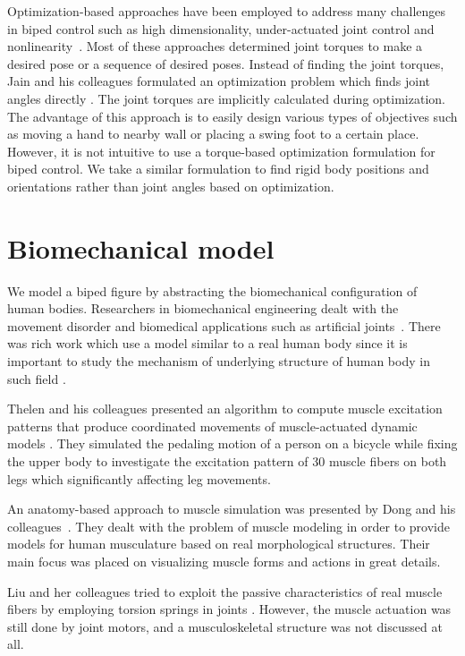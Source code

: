 \documentclass[master,english,final]{kaist-ucs}
\begin{document}
Optimization-based approaches have been employed to address many challenges
in biped control such as high dimensionality, under-actuated joint control and
nonlinearity~\cite{journals/tog/MacchiettoZS09, journals/tog/MuicoLPP09, park}.
Most of these approaches determined joint torques to make a desired pose or
a sequence of desired poses.
Instead of finding the joint torques, Jain and his colleagues formulated
an optimization problem which finds joint angles directly \cite{Jain:09:OIM}.
The joint torques
are implicitly calculated during optimization. The advantage of
this approach is to easily design various types of objectives such as
moving a hand to nearby wall or placing a swing foot to a certain place.
However, it is not intuitive to use a torque-based optimization formulation
for biped control.
We take a similar formulation to find rigid body positions
and orientations rather than joint angles based on optimization.

\section{Biomechanical model}

We model a biped figure by abstracting the biomechanical configuration
of human bodies.
Researchers in biomechanical engineering dealt with the movement
disorder and biomedical applications such as artificial joints~\cite{svsjan}.
There was rich work which use a model similar to
a real human body since it is important to study the mechanism of underlying
structure of human body in such field \cite{vr-305, neptune}.

Thelen and his colleagues presented
an algorithm to compute muscle excitation patterns that produce
coordinated movements of muscle-actuated dynamic models \cite{Thelen2003321}.
They simulated
the pedaling motion of a person on a bicycle while fixing the upper body to investigate the excitation
pattern of 30 muscle fibers on both legs which significantly affecting leg movements.

An anatomy-based approach to muscle simulation was presented by Dong and his colleagues~\cite{10.1109/2945.998668}.
They dealt with the problem of muscle modeling in order to provide models for human musculature based
on real morphological structures. Their main focus was placed on visualizing muscle forms and actions in
great details.

Liu and her colleagues tried to exploit the passive characteristics of
real muscle fibers by employing torsion springs in joints \cite{Liu:2005:LPB}.
However, the muscle actuation was still done by joint motors, and a musculoskeletal
structure was not discussed at all.
\end{document}

